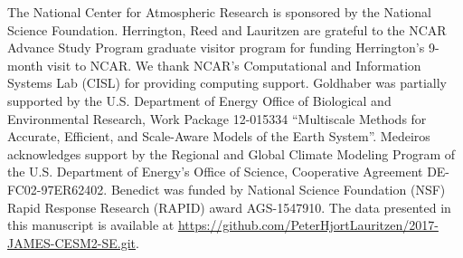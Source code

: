 \documentclass{agujournal}
\begin{document}
%




%
%
%
%
%
%
%


\acknowledgments
The National Center for Atmospheric Research is sponsored by the National Science Foundation. Herrington, Reed and Lauritzen are grateful to the NCAR Advance Study Program graduate visitor program for funding Herrington's 9-month visit to NCAR. We thank NCAR's Computational and Information Systems Lab (CISL) for providing computing support. Goldhaber was partially supported by the U.S. Department of Energy Office of Biological and Environmental Research, Work Package 12-015334 ``Multiscale Methods for Accurate, Efficient, and Scale-Aware Models of the Earth System''. Medeiros acknowledges support by the Regional and Global Climate Modeling Program of the U.S. Department of Energy's Office of Science,  Cooperative Agreement DE-FC02-97ER62402. Benedict was funded by National Science Foundation (NSF) Rapid Response Research (RAPID) award AGS-1547910. The data presented in this manuscript is available at {\url{https://github.com/PeterHjortLauritzen/2017-JAMES-CESM2-SE.git}}.



\end{document}
